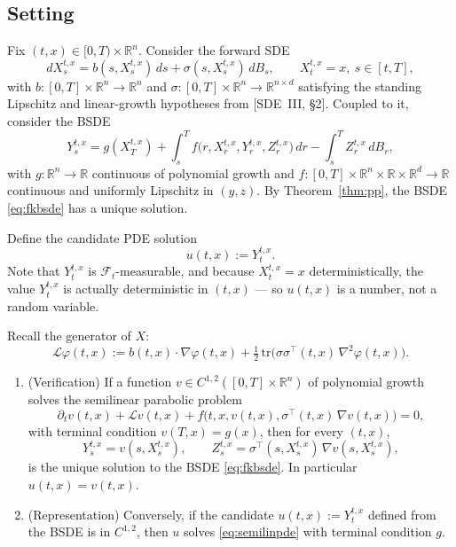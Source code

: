 \documentclass{article}
\newcommand{\R}{\mathbb{R}}
\newcommand{\F}{\mathcal{F}}
\newcommand{\Lc}{\mathcal{L}}
\begin{document}
\subsection{Setting}

Fix $(t, x) \in [0, T) \times \R^n$. Consider the forward SDE
\begin{equation}\label{eq:fwd}
  dX^{t,x}_s = b(s, X^{t,x}_s)\,ds + \sigma(s, X^{t,x}_s)\, dB_s, \qquad X^{t,x}_t = x,\ s \in [t, T],
\end{equation}
with $b : [0, T] \times \R^n \to \R^n$ and $\sigma : [0, T] \times \R^n \to \R^{n \times d}$ satisfying the standing Lipschitz and linear-growth hypotheses from [SDE~III, \S2]. Coupled to it, consider the BSDE
\begin{equation}\label{eq:fkbsde}
  Y^{t,x}_s = g(X^{t,x}_T) + \int_s^T f\!\big(r, X^{t,x}_r, Y^{t,x}_r, Z^{t,x}_r\big)\,dr - \int_s^T Z^{t,x}_r\, dB_r,
\end{equation}
with $g : \R^n \to \R$ continuous of polynomial growth and $f : [0, T] \times \R^n \times \R \times \R^d \to \R$ continuous and uniformly Lipschitz in $(y, z)$. By Theorem~\ref{thm:pp}, the BSDE \eqref{eq:fkbsde} has a unique solution.

Define the candidate PDE solution
\[
  u(t, x) := Y^{t,x}_t.
\]
Note that $Y^{t,x}_t$ is $\F_t$-measurable, and because $X^{t,x}_t = x$ deterministically, the value $Y^{t,x}_t$ is actually deterministic in $(t, x)$ --- so $u(t, x)$ is a number, not a random variable.

Recall the generator of $X$:
\[
  \Lc \varphi(t, x) := b(t, x) \cdot \nabla \varphi(t, x) + \tfrac12\, \mathrm{tr}\!\big(\sigma\sigma^{\top}(t, x)\, \nabla^2 \varphi(t, x)\big).
\]

\begin{theorem}\label{thm:nlfk}
\hfill
\begin{enumerate}
  \item[(a)] (Verification) If a function $v \in C^{1,2}([0, T] \times \R^n)$ of polynomial growth solves the semilinear parabolic problem
  \begin{equation}\label{eq:semilinpde}
    \partial_t v(t, x) + \Lc v(t, x) + f\!\big(t, x, v(t, x), \sigma^{\top}(t, x)\, \nabla v(t, x)\big) = 0,
  \end{equation}
  with terminal condition $v(T, x) = g(x)$, then for every $(t, x)$,
  \[
    Y^{t,x}_s = v(s, X^{t,x}_s), \qquad Z^{t,x}_s = \sigma^{\top}(s, X^{t,x}_s)\, \nabla v(s, X^{t,x}_s),
  \]
  is the unique solution to the BSDE \eqref{eq:fkbsde}. In particular $u(t, x) = v(t, x)$.

  \item[(b)] (Representation) Conversely, if the candidate $u(t, x) := Y^{t,x}_t$ defined from the BSDE is in $C^{1,2}$, then $u$ solves \eqref{eq:semilinpde} with terminal condition $g$.
\end{enumerate}
\end{theorem}
\end{document}
